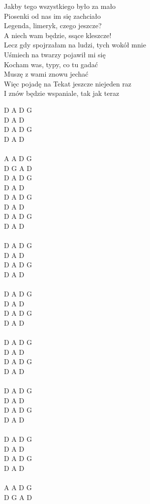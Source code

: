 \documentclass[a5paper, 10pt]{book}
\begin{document}
\begin{minipage}[t]{0.8\textwidth}
  Jakby tego wszystkiego było za mało 		\\
  Piosenki od nas im się zachciało	\\
  Legenda, limeryk, czego jeszcze?		\\
  A niech wam będzie, ssące kleszcze!\\

  Lecz gdy spojrzałam na ludzi, tych wokół mnie 	\\
  Uśmiech na twarzy pojawił mi się\\
  Kocham was, typy, co tu gadać			\\
  Muszę z wami znowu jechać	\\

  \hspace*{5mm}Więc pojadę na Tekat jeszcze niejeden raz 	\\
  \hspace*{5mm}I znów będzie wspaniale, tak jak teraz		\\
\end{minipage}
\begin{minipage}[t]{0.2\textwidth}
  D A D G	\\
  D A D\\
  D A D G\\
  D A D\\
  \\
  A A D G\\
  D G A D\\

  D A D G\\
  D A D\\
  D A D G\\
  D A D\\

  D A D G\\
  D A D\\
  \\
  D A D G\\
  D A D\\
  D A D G\\
  D A D\\
  \\
  D A D G\\
  D A D\\
  D A D G\\
  D A D\\
  \\
  D A D G\\
  D A D\\
  D A D G\\
  D A D\\
  \\
  D A D G\\
  D A D\\
  D A D G\\
  D A D\\
  \\
  D A D G\\
  D A D\\
  D A D G\\
  D A D\\
  \\
  A A D G\\
  D G A D\\
\end{minipage}
\end{document}
